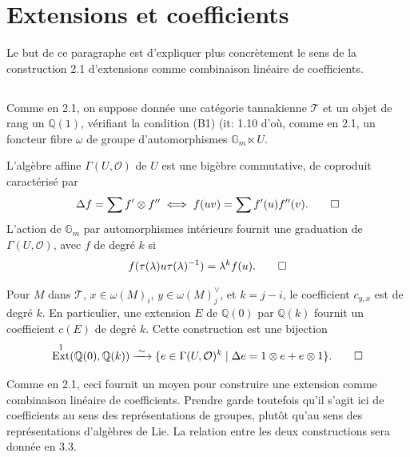 \documentclass[12pt,a4paper]{article}
\theoremstyle{plain}
\theoremstyle{definition}
\theoremstyle{remark}
\DeclareMathOperator{\Ext}{Ext}
\newcommand{\Q}{\mathbb{Q}}
\newcommand{\Gm}{\mathbb{G}_m}
\begin{document}
\section{Extensions et coefficients}

Le but de ce paragraphe est d'expliquer plus concr\`etement le sens de la construction 2.1 d'extensions comme combinaison lin\'eaire de coefficients.

\subsection{}

Comme en 2.1, on suppose donn\'ee une cat\'egorie tannakienne $\mathcal{T}$ et un objet de rang un $\Q(1)$, v\'erifiant la condition (B1) (it: 1.10 d'o\`u, comme en 2.1, un foncteur fibre $\omega$ de groupe d'automorphismes $\Gm\ltimes U$.

L'alg\`ebre affine $\Gamma(U,\mathcal{O})$ de $U$ est une big\`ebre commutative, de coproduit caract\'eris\'e par
\begin{equation*}
\Delta f = \sum f'\otimes f'' \iff f(uv) = \sum f'(u)f''(v).\qedhere
\end{equation*}
L'action de $\Gm$ par automorphismes int\'erieurs fournit une graduation de $\Gamma(U,\mathcal{O})$, avec $f$ de degr\'e $k$ si
\begin{equation*}
f(\tau(\lambda)u\tau(\lambda)^{-1}) = \lambda^k f(u).\qedhere
\end{equation*}

Pour $M$ dans $\mathcal{T}$, $x\in\omega(M)_i$, $y\in\omega(M)_j^\vee$, et $k=j-i$, le coefficient $c_{y,x}$ est de degr\'e $k$. En particulier, une extension $E$ de $\Q(0)$ par $\Q(k)$ fournit un coefficient $c(E)$ de degr\'e $k$. Cette construction est une bijection
\begin{equation*}
\Ext^1(\Q(0),\Q(k)) \xrightarrow{\;\sim\;} \{e\in\Gamma(U,\mathcal{O})^k \mid \Delta e = 1\otimes e + e\otimes 1\}.\qedhere
\end{equation*}

Comme en 2.1, ceci fournit un moyen pour construire une extension comme combinaison lin\'eaire de coefficients. Prendre garde toutefois qu'il s'agit ici de coefficients au sens des repr\'esentations de groupes, plut\^ot qu'au sens des repr\'esentations d'alg\`ebres de Lie. La relation entre les deux constructions sera donn\'ee en 3.3.

\subsection{}
\end{document}
